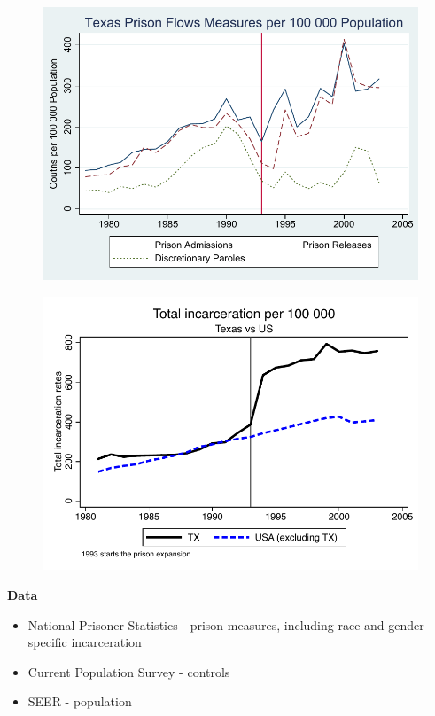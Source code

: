 \documentclass[notes=show]{beamer}
\begin{document}
\begin{frame}[shrink=30,plain]

\begin{figure}
\includegraphics{./lecture_includes/flow_rate_figure.pdf}
\end{figure}
\end{frame}

\begin{frame}[shrink=30,plain]

\begin{figure}
\includegraphics{./lecture_includes/total_incarceration.pdf}
\end{figure}
\end{frame}


\begin{frame}[plain]
\begin{center}
\textbf{Data}
\end{center}

	\begin{itemize}
	\item National Prisoner Statistics - prison measures, including race and gender-specific incarceration
	\item Current Population Survey - controls
	\item SEER - population
	\end{itemize}
\end{frame}
\newpage
\clearpage
\end{document}
